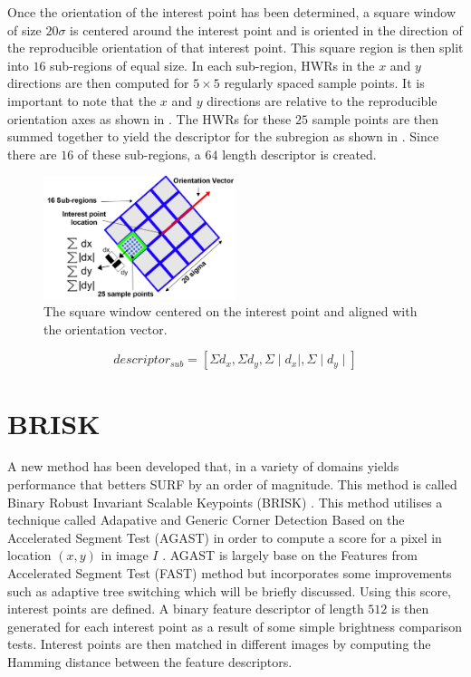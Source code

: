 \documentclass{report}
\begin{document}
Once the orientation of the interest point has been determined, a square window of size $20\sigma$ is centered around the interest point and is oriented in the direction of the reproducible orientation of that interest point. This square region is then split into $16$ sub-regions of equal size. In each sub-region, HWRs in the $x$ and $y$ directions are then computed for $5 \times 5$ regularly spaced sample points. It is important to note that the $x$ and $y$ directions are relative to the reproducible orientation axes as shown in  \cite{Evans2009}. The HWRs for these $25$ sample points are then summed together to yield the descriptor for the subregion as shown in . Since there are $16$ of these sub-regions, a $64$ length descriptor is created.\\

\begin{figure}[h!] 
  \centering
    \includegraphics[width=0.5\textwidth]{../Drawings/methods/SURF2D_Descriptor.jpg}
    \caption{The square window centered on the interest point and aligned with the orientation vector.}
    \label{fig:reproducibleAxes}
\end{figure}

\begin{equation}
descriptor_{sub} = [\Sigma d_x, \Sigma d_y,  \Sigma \mid d_x \mid , \Sigma \mid d_y \mid] 
\label{eqn:descriptorSub}
\end{equation} 



\section{BRISK}
\label{sec:brisk}
A new method has been developed that, in a variety of domains yields performance that betters SURF by an order of magnitude. This method is called Binary Robust Invariant Scalable Keypoints (BRISK) \cite{Leutenegger2011}. This method utilises a technique called Adapative and Generic Corner Detection Based on the Accelerated Segment Test (AGAST) in order to compute a score for a pixel in location $(x,y)$ in image $I$ \cite{Mair2010}. AGAST is largely base on the Features from Accelerated Segment Test (FAST) \cite{Rosten2006} method but incorporates some improvements such as adaptive tree switching which will be briefly discussed. Using this score, interest points are defined. A binary feature descriptor of length $512$ is then generated for each interest point as a result of some simple brightness comparison tests. Interest points are then matched in different images by computing the Hamming distance between the feature descriptors. \\
\end{document}
